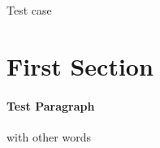 \documentclass[11pt]{NSFamsart}
\begin{document}
Test case

\section{First Section}

\paragraph*{Test Paragraph} with other words
\end{document}
